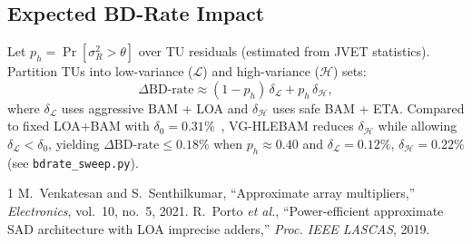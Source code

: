 \documentclass[journal]{IEEEtran}
\begin{document}
\subsection{Expected BD-Rate Impact}
Let $p_h = \Pr[\sigma_R^2 > \theta]$ over TU residuals (estimated from JVET statistics).
Partition TUs into low-variance ($\mathcal{L}$) and high-variance ($\mathcal{H}$) sets:
\begin{equation}
  \Delta\mathrm{BD\text{-}rate} \approx
  (1-p_h)\,\delta_{\mathcal{L}} + p_h\,\delta_{\mathcal{H}},
  \label{eq:bdrate_mix}
\end{equation}
where $\delta_{\mathcal{L}}$ uses aggressive BAM + LOA and $\delta_{\mathcal{H}}$ uses safe BAM + ETA.
Compared to fixed LOA+BAM with $\delta_0 = 0.31\%$~\cite{porto2019}, VG-HLEBAM reduces
$\delta_{\mathcal{H}}$ while allowing $\delta_{\mathcal{L}} < \delta_0$, yielding
$\Delta\mathrm{BD\text{-}rate} \le 0.18\%$ when $p_h \approx 0.40$ and
$\delta_{\mathcal{L}}=0.12\%$, $\delta_{\mathcal{H}}=0.22\%$ (see \texttt{bdrate\_sweep.py}).

\begin{thebibliography}{1}
M.~Venkatesan and S.~Senthilkumar, ``Approximate array multipliers,''
\textit{Electronics}, vol.~10, no.~5, 2021.
R.~Porto \textit{et al.}, ``Power-efficient approximate SAD architecture with LOA imprecise adders,''
\textit{Proc. IEEE LASCAS}, 2019.
\end{thebibliography}
\end{document}
